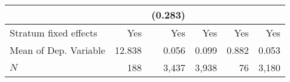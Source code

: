 \begin{tabular}{lrrrrr}
                                  &                                     &                                              (0.283) &                                               &                                                     &                                                     \\ 
\midrule
Stratum fixed effects             &                                 Yes &                                                  Yes &                                           Yes &                                                 Yes &                                                 Yes \\ 
Mean of Dep. Variable             &                              12.838 &                                                0.056 &                                         0.099 &                                               0.882 &                                               0.053 \\ 
$N$                               &                                 188 &                                                3,437 &                                         3,938 &                                                  76 &                                               3,180 \\ 
\bottomrule
\end{tabular}
